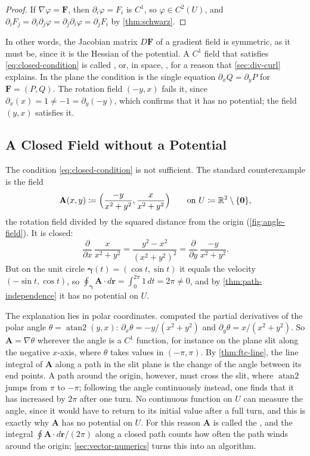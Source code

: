 \begin{proof}
If $\nabla\varphi=\mathbf F$, then $\partial_i\varphi=F_i$ is $C^1$, so $\varphi\in C^2(U)$, and $\partial_iF_j=\partial_i\partial_j\varphi=\partial_j\partial_i\varphi=\partial_jF_i$ by \cref{thm:schwarz}.
\end{proof}

In other words, the Jacobian matrix $D\mathbf F$ of a gradient field is symmetric, as it must be, since it is the Hessian of the potential. A $C^1$ field that satisfies \eqref{eq:closed-condition} is called , or, in space, , for a reason that \cref{sec:div-curl} explains. In the plane the condition is the single equation $\partial_xQ=\partial_yP$ for $\mathbf F=(P,Q)$. The rotation field $(-y,x)$ fails it, since $\partial_x(x)=1\ne-1=\partial_y(-y)$, which confirms that it has no potential; the field $(y,x)$ satisfies it.

\subsection{A Closed Field without a Potential}

The condition \eqref{eq:closed-condition} is not sufficient. The standard counterexample is the field
\begin{equation}
\mathbf A(x,y)\coloneqq\Bigl(\frac{-y}{x^2+y^2},\frac x{x^2+y^2}\Bigr)\qquad\text{on }U\coloneqq\mathbb R^2\setminus\{\mathbf0\},
\label{eq:angle-field}
\end{equation}
the rotation field divided by the squared distance from the origin (\cref{fig:angle-field}). It is closed:
\[
\frac{\partial}{\partial x}\,\frac x{x^2+y^2}=\frac{y^2-x^2}{(x^2+y^2)^2}=\frac{\partial}{\partial y}\,\frac{-y}{x^2+y^2} .
\]
But on the unit circle $\boldsymbol\gamma(t)=(\cos t,\sin t)$ it equals the velocity $(-\sin t,\cos t)$, so $\oint_{\boldsymbol\gamma}\mathbf A\cdot d\mathbf r=\int_0^{2\pi}1\,dt=2\pi\ne0$, and by \cref{thm:path-independence} it has no potential on $U$.

The explanation lies in polar coordinates.  computed the partial derivatives of the polar angle $\theta=\operatorname{atan2}(y,x)$: $\partial_x\theta=-y/(x^2+y^2)$ and $\partial_y\theta=x/(x^2+y^2)$. So $\mathbf A=\nabla\theta$ wherever the angle is a $C^1$ function, for instance on the plane slit along the negative $x$-axis, where $\theta$ takes values in $(-\pi,\pi)$. By \cref{thm:ftc-line}, the line integral of $\mathbf A$ along a path in the slit plane is the change of the angle between its end points. A path around the origin, however, must cross the slit, where $\operatorname{atan2}$ jumps from $\pi$ to $-\pi$; following the angle continuously instead, one finds that it has increased by $2\pi$ after one turn. No continuous function on $U$ can measure the angle, since it would have to return to its initial value after a full turn, and this is exactly why $\mathbf A$ has no potential on $U$. For this reason $\mathbf A$ is called the , and the integral $\oint\mathbf A\cdot d\mathbf r/(2\pi)$ along a closed path counts how often the path winds around the origin; \cref{sec:vector-numerics} turns this into an algorithm.

